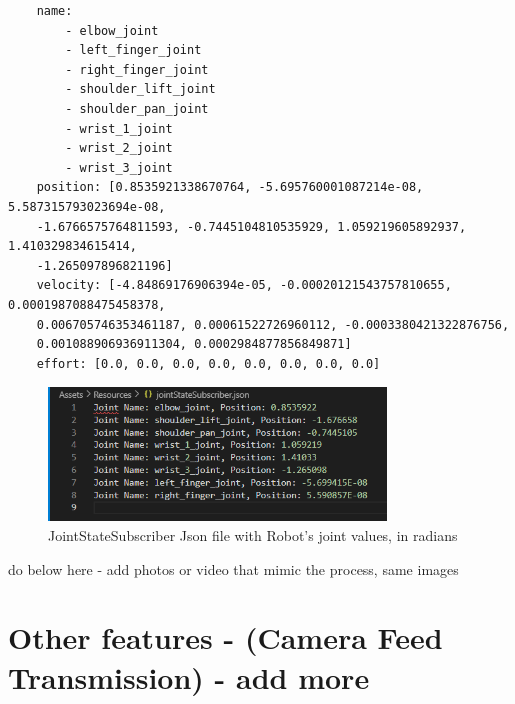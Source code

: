     
    \begin{verbatim}
    name:
        - elbow_joint
        - left_finger_joint
        - right_finger_joint
        - shoulder_lift_joint
        - shoulder_pan_joint
        - wrist_1_joint
        - wrist_2_joint
        - wrist_3_joint
    position: [0.8535921338670764, -5.695760001087214e-08, 5.587315793023694e-08, 
    -1.6766575764811593, -0.7445104810535929, 1.059219605892937, 1.410329834615414,
    -1.265097896821196]
    velocity: [-4.84869176906394e-05, -0.00020121543757810655, 0.0001987088475458378,
    0.006705746353461187, 0.00061522726960112, -0.0003380421322876756, 
    0.001088906936911304, 0.0002984877856849871]
    effort: [0.0, 0.0, 0.0, 0.0, 0.0, 0.0, 0.0, 0.0]
    \end{verbatim}
    
    \begin{figure}[h]
        \centering
        \includegraphics[width=0.8\textwidth]{figs/jsonJointStateSub.png}
        \caption{JointStateSubscriber Json file with Robot's joint values, in radians}
        \label{fig:json_joint_states}
    \end{figure}
    
    do below here - add photos or video that mimic the process, same images
    
    \section{Other features - (Camera Feed Transmission) - add more}
        